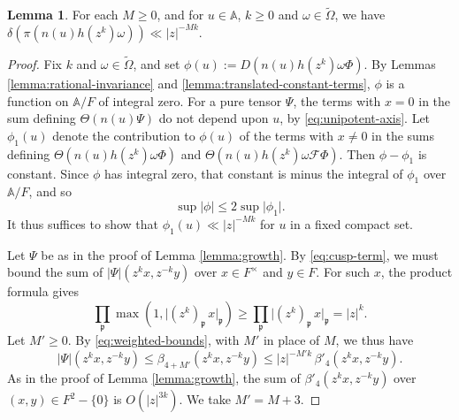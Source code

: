 \documentclass[reqno]{amsart}
\theoremstyle{plain}
\theoremstyle{definition}
\theoremstyle{itplain}
\newtheorem{lemma}[theorem]{Lemma}
\numberwithin{equation}{section}
\numberwithin{theorem}{section}
\begin{document}
\begin{lemma}\label{lemma:decay}
  For each $M \geq 0$, and for $u \in \mathbb{A}$, $k \geq 0$ and $\omega \in \tilde{\Omega}$, we have $\delta(\pi(n(u) h(z^k) \omega)) \ll \lvert z \rvert^{-M k}$.
\end{lemma}
\begin{proof}
  Fix $k$ and $\omega \in \tilde{\Omega}$, and set $\phi(u) := D(n(u) h(z^k) \omega \Phi)$.  By Lemmas \ref{lemma:rational-invariance} and \ref{lemma:translated-constant-terms}, $\phi$ is a function on $\mathbb{A} / F$ of integral zero.  For a pure tensor $\Psi$, the terms with $x = 0$ in the sum defining $\Theta(n(u) \Psi)$ do not depend upon $u$, by \eqref{eq:unipotent-axis}.  Let $\phi_1(u)$ denote the contribution to $\phi(u)$ of the terms with $x \neq 0$ in the sums defining $\Theta(n(u) h(z^k) \omega \Phi)$ and $\Theta(n(u) h(z^k) \omega \mathcal{F} \Phi)$.  Then $\phi - \phi_1$ is constant.  Since $\phi$ has integral zero, that constant is minus the integral of $\phi_1$ over $\mathbb{A} / F$, and so
  \begin{equation*}
    \sup \lvert \phi \rvert \leq 2 \sup \lvert \phi_1 \rvert.
  \end{equation*}
  It thus suffices to show that $\phi_1(u) \ll \lvert z \rvert^{-M k}$ for $u$ in a fixed compact set.

  Let $\Psi$ be as in the proof of Lemma \ref{lemma:growth}.  By \eqref{eq:cusp-term}, we must bound the sum of $\lvert \Psi \rvert(z^k x, z^{-k} y)$ over $x \in F^\times$ and $y \in F$.  For such $x$, the product formula gives
  \begin{equation*}
    \prod_{\mathfrak{p}} \max(1, \lvert (z^k)_{\mathfrak{p}} \, x \rvert_{\mathfrak{p}}) \geq \prod_{\mathfrak{p}} \lvert (z^k)_{\mathfrak{p}} \, x \rvert_{\mathfrak{p}} = \lvert z \rvert^{k}.
  \end{equation*}
  Let $M' \geq 0$.  By \eqref{eq:weighted-bounds}, with $M'$ in place of $M$, we thus have
  \begin{equation*}
    \lvert \Psi \rvert(z^k x, z^{-k} y)
    \leq \beta_{4 + M'}(z^k x, z^{-k} y)
    \leq \lvert z \rvert^{- M' k} \, \beta'_4(z^k x, z^{-k} y).
  \end{equation*}
  As in the proof of Lemma \ref{lemma:growth}, the sum of $\beta'_4(z^k x, z^{-k} y)$ over $(x, y) \in F^2 - \{0\}$ is $O(\lvert z \rvert^{3 k})$.  We take $M' = M + 3$.
\end{proof}
\end{document}
